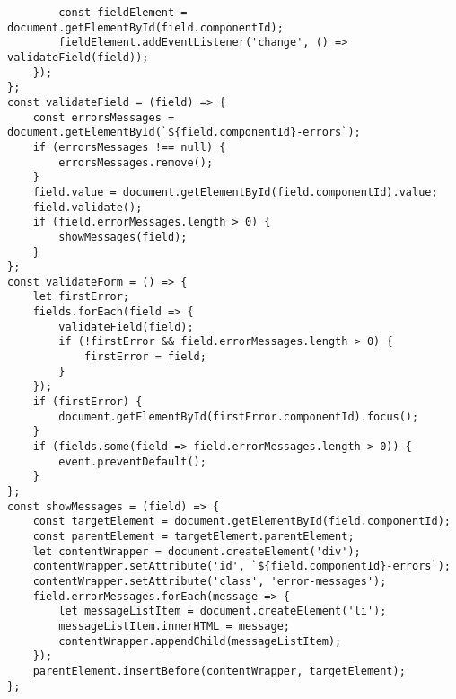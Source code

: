\documentclass[a4paper,14pt]{extarticle}
\begin{document}
\begin{lstlisting}
        const fieldElement = document.getElementById(field.componentId);
        fieldElement.addEventListener('change', () => validateField(field));
    });
};
const validateField = (field) => {
    const errorsMessages = document.getElementById(`${field.componentId}-errors`);
    if (errorsMessages !== null) {
        errorsMessages.remove();
    }
    field.value = document.getElementById(field.componentId).value;
    field.validate();
    if (field.errorMessages.length > 0) {
        showMessages(field);
    }
};
const validateForm = () => {
    let firstError;
    fields.forEach(field => {
        validateField(field);
        if (!firstError && field.errorMessages.length > 0) {
            firstError = field;
        }
    });
    if (firstError) {
        document.getElementById(firstError.componentId).focus();
    }
    if (fields.some(field => field.errorMessages.length > 0)) {
        event.preventDefault();
    }
};
const showMessages = (field) => {
    const targetElement = document.getElementById(field.componentId);
    const parentElement = targetElement.parentElement;
    let contentWrapper = document.createElement('div');
    contentWrapper.setAttribute('id', `${field.componentId}-errors`);
    contentWrapper.setAttribute('class', 'error-messages');
    field.errorMessages.forEach(message => {
        let messageListItem = document.createElement('li');
        messageListItem.innerHTML = message;
        contentWrapper.appendChild(messageListItem);
    });
    parentElement.insertBefore(contentWrapper, targetElement);
};
\end{lstlisting}
\end{document}

